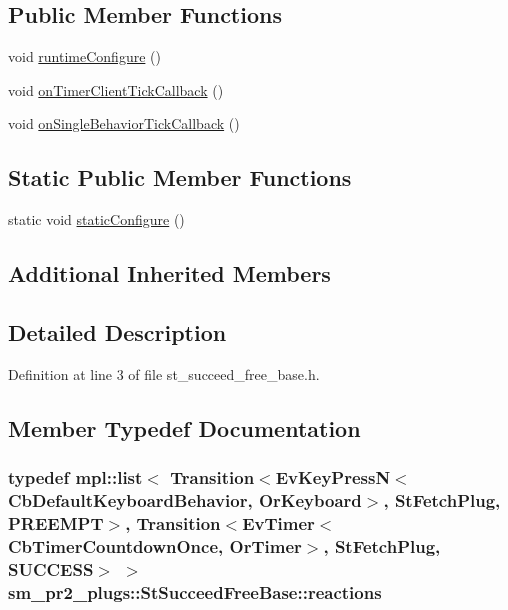 \subsection*{Public Member Functions}
\begin{DoxyCompactItemize}
\item 
void \hyperlink{structsm__pr2__plugs_1_1StSucceedFreeBase_a90ef93147b370cf240d7800f1414648d}{runtime\+Configure} ()
\item 
void \hyperlink{structsm__pr2__plugs_1_1StSucceedFreeBase_a53328e9b7c378014ba1d19b835808582}{on\+Timer\+Client\+Tick\+Callback} ()
\item 
void \hyperlink{structsm__pr2__plugs_1_1StSucceedFreeBase_a18e063dd7dc924cd903824eaa2b680f7}{on\+Single\+Behavior\+Tick\+Callback} ()
\end{DoxyCompactItemize}
\subsection*{Static Public Member Functions}
\begin{DoxyCompactItemize}
\item 
static void \hyperlink{structsm__pr2__plugs_1_1StSucceedFreeBase_aeae400a9749af1efbe82e16b1b72529b}{static\+Configure} ()
\end{DoxyCompactItemize}
\subsection*{Additional Inherited Members}


\subsection{Detailed Description}


Definition at line 3 of file st\+\_\+succeed\+\_\+free\+\_\+base.\+h.



\subsection{Member Typedef Documentation}
\subsubsection[{\texorpdfstring{reactions}{reactions}}]{\setlength{\rightskip}{0pt plus 5cm}typedef mpl\+::list$<$ Transition$<$Ev\+Key\+PressN$<$Cb\+Default\+Keyboard\+Behavior, {\bf Or\+Keyboard}$>$, {\bf St\+Fetch\+Plug}, {\bf P\+R\+E\+E\+M\+PT}$>$, Transition$<$Ev\+Timer$<$Cb\+Timer\+Countdown\+Once, {\bf Or\+Timer}$>$, {\bf St\+Fetch\+Plug}, {\bf S\+U\+C\+C\+E\+SS}$>$ $>$ {\bf sm\+\_\+pr2\+\_\+plugs\+::\+St\+Succeed\+Free\+Base\+::reactions}}\hypertarget{structsm__pr2__plugs_1_1StSucceedFreeBase_a14771e3fa3c17d96f2b8c3f6f39089ec}{}\label{structsm__pr2__plugs_1_1StSucceedFreeBase_a14771e3fa3c17d96f2b8c3f6f39089ec}


